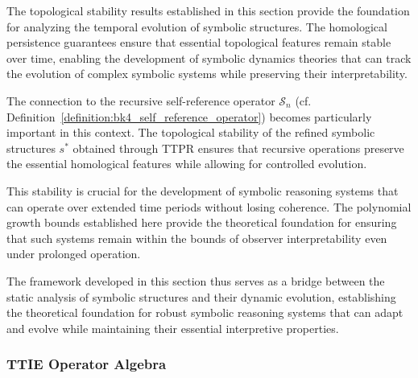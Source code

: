\begin{remark}
\label{remark:bk4_topological_stability_to_symbolic_dynamics}
The topological stability results established in this section provide the foundation for analyzing the temporal evolution of symbolic structures. The homological persistence guarantees ensure that essential topological features remain stable over time, enabling the development of symbolic dynamics theories that can track the evolution of complex symbolic systems while preserving their interpretability.

The connection to the recursive self-reference operator $\mathcal{S}_n$ (cf. Definition~\ref{definition:bk4_self_reference_operator}) becomes particularly important in this context. The topological stability of the refined symbolic structures $s^*$ obtained through TTPR ensures that recursive operations preserve the essential homological features while allowing for controlled evolution.

This stability is crucial for the development of symbolic reasoning systems that can operate over extended time periods without losing coherence. The polynomial growth bounds established here provide the theoretical foundation for ensuring that such systems remain within the bounds of observer interpretability even under prolonged operation.

The framework developed in this section thus serves as a bridge between the static analysis of symbolic structures and their dynamic evolution, establishing the theoretical foundation for robust symbolic reasoning systems that can adapt and evolve while maintaining their essential interpretive properties.
\end{remark}

\subsubsection{TTIE Operator Algebra}
\label{subsec:bk4_ttie_operator_algebra}
